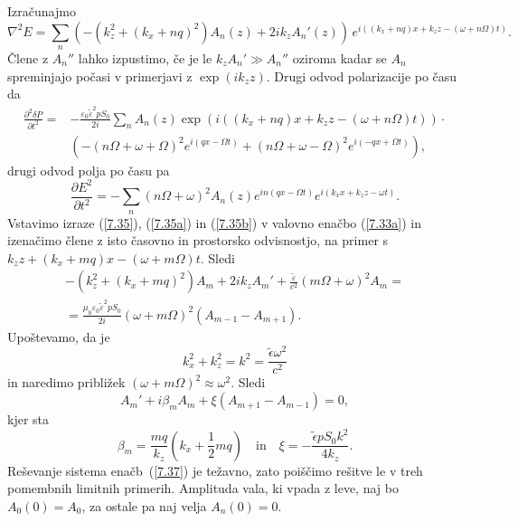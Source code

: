Izračunajmo 
\begin{equation}
\nabla^{2}E=\sum_{n}\left( -(k_{z}^{2}+(k_{x}+nq)^{2})A_{n}(z)+2ik_{z}A_{n}'(z)\right) \, 
e^{i((k_x+nq)x+k_{z}z-(\omega+n\Omega)t)}.
\label{7.35}
\end{equation}
Člene z $A_{n}''$ lahko izpustimo, če je le $k_{z}A_{n}'\gg A_{n}''$ oziroma 
kadar se $A_{n}$ spreminjajo počasi v primerjavi z $\exp(ik_{z}z)$. Drugi odvod 
polarizacije po času da
\begin{equation}
\begin{split}
\frac{\partial^2 \delta P}{\partial t^2} =&-\frac{\varepsilon_0 \tilde{\varepsilon}^2pS_0}{2i} 
\sum_{n} A_n(z) \exp\left(i((k_x+nq)x+k_{z}z-(\omega+n\Omega)t)\right) \cdot \\ &\left(
-(n\Omega+\omega+\Omega)^2e^{i(qx-\Omega t)} + (n\Omega+\omega-\Omega)^2e^{i(-qx+\Omega t)} \right),
\label{7.35a}
\end{split}
\end{equation}
drugi odvod polja po času pa 
\begin{equation}
\frac{\partial E^{2}}{\partial t^{2}} = - \sum_{n}(n\Omega + \omega)^2 
A_{n}(z)e^{in(qx-\Omega t)}e^{i(k_{x}x+k_{z}z-\omega t)}.
\label{7.35b}
\end{equation}
Vstavimo izraze (\ref{7.35}), (\ref{7.35a}) in (\ref{7.35b}) v valovno enačbo (\ref{7.33a})
in izenačimo člene z isto časovno in prostorsko odvisnostjo, na primer
s $k_z z+(k_x+mq)x-(\omega+m\Omega)t$. Sledi
\begin{eqnarray}
-\left(k_{z}^{2}+(k_{x}+mq)^{2}\right)A_{m}+2ik_{z}A_{m}' + \frac{\tilde{\varepsilon}}{c^2}(m\Omega+\omega)^2A_m
=\\ =\frac{\mu_0\varepsilon_0\tilde{\varepsilon}^2pS_0}{2i}(\omega+m\Omega)^{2}(A_{m-1}-A_{m+1}).
\end{eqnarray}
Upoštevamo, da je 
\begin{equation} 
k_{x}^{2}+k_{z}^{2}=k^{2}=\frac{\tilde{\epsilon}\omega^2}{c^{2}}
\end{equation}
in naredimo približek $(\omega +m\Omega)^2 \approx \omega^2$.
Sledi
\begin{equation}
A_{m}'+i\beta_{m}A_{m}+\xi(A_{m+1}-A_{m-1})=0,
\label{7.37}
\end{equation}
kjer sta
\begin{equation}
\beta_{m}=\frac{mq}{k_{z}}(k_{x}+\frac{1}{2}mq) \quad \mathrm{in} \quad \xi=-\frac{\tilde{\epsilon} pS_0k^2}{4k_z}.
\label{7.38}
\end{equation}
Reševanje sistema enačb~(\ref{7.37}) je težavno, zato poiščimo rešitve le v treh
pomembnih limitnih primerih. Amplituda vala, ki vpada z leve, naj bo $A_{0}(0)=A_{0}$, 
za ostale pa naj velja $A_{n}(0)=0$.

